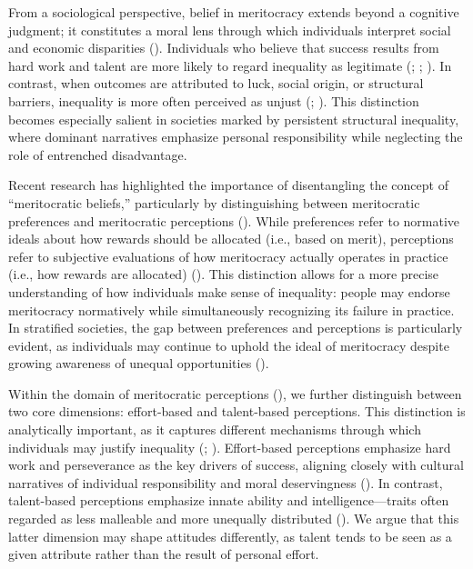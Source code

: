 \documentclass[
  12pt,
]{article}
\begin{document}
From a sociological perspective, belief in meritocracy extends beyond a
cognitive judgment; it constitutes a moral lens through which
individuals interpret social and economic disparities
(). Individuals who believe
that success results from hard work and talent are more likely to regard
inequality as legitimate (; ; ). In contrast, when outcomes are attributed to luck,
social origin, or structural barriers, inequality is more often
perceived as unjust (; ). This distinction becomes especially salient in societies
marked by persistent structural inequality, where dominant narratives
emphasize personal responsibility while neglecting the role of
entrenched disadvantage.

Recent research has highlighted the importance of disentangling the
concept of ``meritocratic beliefs,'' particularly by distinguishing
between meritocratic preferences and meritocratic perceptions
().
While preferences refer to normative ideals about how rewards should be
allocated (i.e., based on merit), perceptions refer to subjective
evaluations of how meritocracy actually operates in practice (i.e., how
rewards are allocated) (). This distinction allows for a more precise understanding of how
individuals make sense of inequality: people may endorse meritocracy
normatively while simultaneously recognizing its failure in practice. In
stratified societies, the gap between preferences and perceptions is
particularly evident, as individuals may continue to uphold the ideal of
meritocracy despite growing awareness of unequal opportunities
().

Within the domain of meritocratic perceptions
(),
we further distinguish between two core dimensions: effort-based and
talent-based perceptions. This distinction is analytically important, as
it captures different mechanisms through which individuals may justify
inequality (; ). Effort-based
perceptions emphasize hard work and perseverance as the key drivers of
success, aligning closely with cultural narratives of individual
responsibility and moral deservingness
(). In contrast,
talent-based perceptions emphasize innate ability and
intelligence---traits often regarded as less malleable and more
unequally distributed (). We
argue that this latter dimension may shape attitudes differently, as
talent tends to be seen as a given attribute rather than the result of
personal effort.
\end{document}
